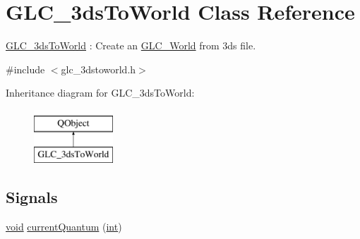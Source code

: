 \hypertarget{class_g_l_c__3ds_to_world}{\section{G\-L\-C\-\_\-3ds\-To\-World Class Reference}
\label{class_g_l_c__3ds_to_world}
}


\hyperlink{class_g_l_c__3ds_to_world}{G\-L\-C\-\_\-3ds\-To\-World} \-: Create an \hyperlink{class_g_l_c___world}{G\-L\-C\-\_\-\-World} from 3ds file.  




{\ttfamily \#include $<$glc\-\_\-3dstoworld.\-h$>$}

Inheritance diagram for G\-L\-C\-\_\-3ds\-To\-World\-:\begin{figure}[H]
\begin{center}
\leavevmode
\includegraphics[height=2.000000cm]{class_g_l_c__3ds_to_world}
\end{center}
\end{figure}
\subsection*{Signals}
\begin{DoxyCompactItemize}
\item 
\hyperlink{group___u_a_v_objects_plugin_ga444cf2ff3f0ecbe028adce838d373f5c}{void} \hyperlink{class_g_l_c__3ds_to_world_a3343491798d1baaae0cccf2ef3f78938}{current\-Quantum} (\hyperlink{ioapi_8h_a787fa3cf048117ba7123753c1e74fcd6}{int})
\end{DoxyCompactItemize}
